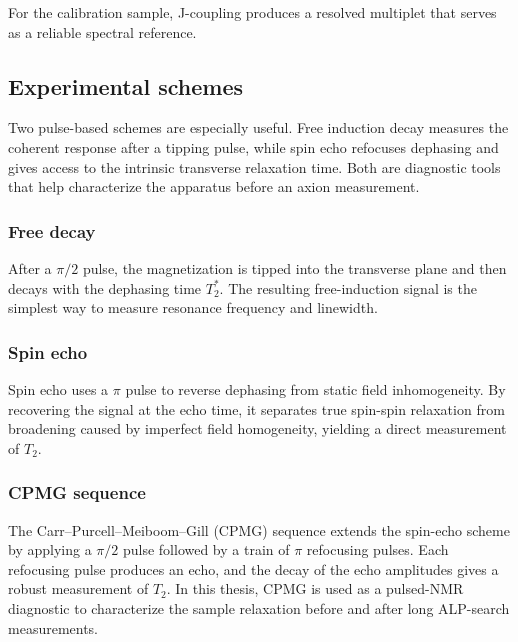 For the calibration sample, J-coupling produces a resolved multiplet that serves as a reliable spectral reference.

\subsection{Experimental schemes}
Two pulse-based schemes are especially useful. Free induction decay measures the coherent response after a tipping pulse, while spin echo refocuses dephasing and gives access to the intrinsic transverse relaxation time. Both are diagnostic tools that help characterize the apparatus before an axion measurement.

\subsubsection{Free decay}\label{sec:NMR:scheme:1Pulse}
After a $\pi/2$ pulse, the magnetization is tipped into the transverse plane and then decays with the dephasing time $T_2^*$. The resulting free-induction signal is the simplest way to measure resonance frequency and linewidth.

\subsubsection{Spin echo}\label{sec:NMR:scheme:echo}
Spin echo uses a $\pi$ pulse to reverse dephasing from static field inhomogeneity. By recovering the signal at the echo time, it separates true spin-spin relaxation from broadening caused by imperfect field homogeneity, yielding a direct measurement of $T_2$.

\subsubsection{CPMG sequence}\label{sec:NMR:scheme:CPMG}
The Carr--Purcell--Meiboom--Gill (CPMG) sequence extends the spin-echo scheme by applying a $\pi/2$ pulse followed by a train of $\pi$ refocusing pulses. Each refocusing pulse produces an echo, and the decay of the echo amplitudes gives a robust measurement of $T_2$. In this thesis, CPMG is used as a pulsed-NMR diagnostic to characterize the sample relaxation before and after long ALP-search measurements.


